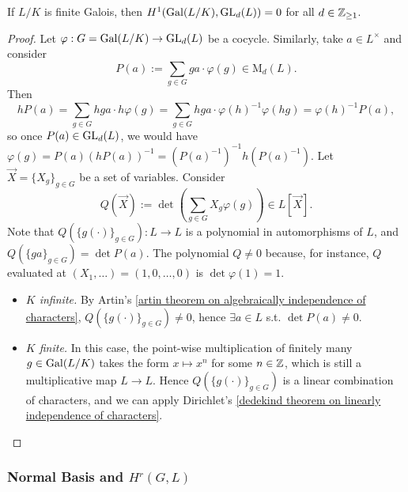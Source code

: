 \begin{theorem}[Hilbert 90]\label{Hilbert 90 - H1(Gal GL) = 0}
    If $L/K$ is finite Galois, then $H^1(\operatorname{Gal}(L/K), \operatorname{GL}_d(L)) = 0$ for all $d\in\mathbb{Z}_{\ge 1}$.
\end{theorem}
\begin{proof}
Let $\varphi : G = \operatorname{Gal}(L/K)\to \operatorname{GL}_d(L)$ be a cocycle.
Similarly, take $a\in L^\times$ and consider \[P(a) := \sum_{g\in G} ga\cdot \varphi(g)\in \mathrm{M}_d(L).\]
Then \[hP(a) = \sum_{g\in G} hga\cdot h\varphi(g)
= \sum_{g\in G} hga\cdot \varphi(h)^{-1}\varphi(hg) = \varphi(h)^{-1}P(a),\]
so once $P(a)\in \operatorname{GL}_d(L)$,
we would have $\varphi(g) = P(a)\left( hP(a ) \right)^{-1} = \left( P(a)^{-1} \right)^{-1}h(P(a)^{-1})$.
Let $\vec{X} = \{X_g\}_{g\in G}$ be a set of variables. Consider
\[    Q(\vec{X}) := \det\left( \sum_{g\in G}X_g\varphi(g) \right)\in L[\vec{X}].\]
Note that $Q(\{g(\cdot )\}_{g\in G}) : L\to L$ is a polynomial in automorphisms of $L$, and $Q(\{ga\}_{g\in G}) = \det P(a)$.
The polynomial $Q\ne 0$ because, for instance,
$Q$ evaluated at $(X_1, \dots) = (1, 0, \dots, 0)$ is
$\det \varphi(1) = 1$.

\begin{itemize}
\item \textit{$K$ infinite.}
By Artin's \cref{artin theorem on algebraically independence of characters},
$Q(\{g(\cdot )\}_{g\in G})\ne 0$, hence $\exists a\in L$ s.t. $\det P(a)\ne 0$.

\item \textit{$K$ finite.}
In this case,
the point-wise multiplication of finitely many $g\in\operatorname{Gal}(L/K)$
takes the form $x\mapsto x^{n}$ for some $n\in\mathbb{Z}$,
which is still a multiplicative map $L\to L$.
Hence $Q(\{g(\cdot )\}_{g\in G})$ is a linear combination
of characters, and we can apply Dirichlet's \cref{dedekind theorem on linearly independence of characters}.
\qedhere
\end{itemize}


\end{proof}

\subsubsection{Normal Basis and \texorpdfstring{$H^r(G, L)$}{Hr(G, L)}}

